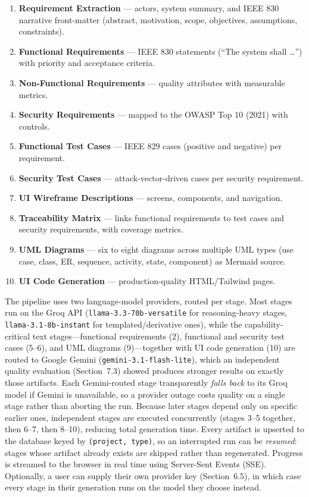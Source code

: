 \documentclass[12pt,a4paper,oneside]{report}
\begin{document}
\begin{enumerate}[leftmargin=*,nosep]
  \item \textbf{Requirement Extraction} --- actors, system summary, and IEEE 830 narrative front-matter (abstract, motivation, scope, objectives, assumptions, constraints).
  \item \textbf{Functional Requirements} --- IEEE 830 statements (``The system shall \ldots'') with priority and acceptance criteria.
  \item \textbf{Non-Functional Requirements} --- quality attributes with measurable metrics.
  \item \textbf{Security Requirements} --- mapped to the OWASP Top 10 (2021) with controls.
  \item \textbf{Functional Test Cases} --- IEEE 829 cases (positive and negative) per requirement.
  \item \textbf{Security Test Cases} --- attack-vector-driven cases per security requirement.
  \item \textbf{UI Wireframe Descriptions} --- screens, components, and navigation.
  \item \textbf{Traceability Matrix} --- links functional requirements to test cases and security requirements, with coverage metrics.
  \item \textbf{UML Diagrams} --- six to eight diagrams across multiple UML types (use case, class, ER, sequence, activity, state, component) as Mermaid source.
  \item \textbf{UI Code Generation} --- production-quality HTML/Tailwind pages.
\end{enumerate}

The pipeline uses two language-model providers, routed per stage. Most stages run on the Groq API (\texttt{llama-3.3-70b-versatile} for reasoning-heavy stages, \texttt{llama-3.1-8b-instant} for templated/derivative ones), while the capability-critical text stages---functional requirements (2), functional and security test cases (5--6), and UML diagrams (9)---together with UI code generation (10) are routed to Google Gemini (\texttt{gemini-3.1-flash-lite}), which an independent quality evaluation (Section~7.3) showed produces stronger results on exactly those artifacts. Each Gemini-routed stage transparently \emph{falls back} to its Groq model if Gemini is unavailable, so a provider outage costs quality on a single stage rather than aborting the run. Because later stages depend only on specific earlier ones, independent stages are executed concurrently (stages 3--5 together, then 6--7, then 8--10), reducing total generation time. Every artifact is upserted to the database keyed by \texttt{(project, type)}, so an interrupted run can be \emph{resumed}: stages whose artifact already exists are skipped rather than regenerated. Progress is streamed to the browser in real time using Server-Sent Events (SSE). Optionally, a user can supply their own provider key (Section~6.5), in which case every stage in their generation runs on the model they choose instead.
\end{document}

